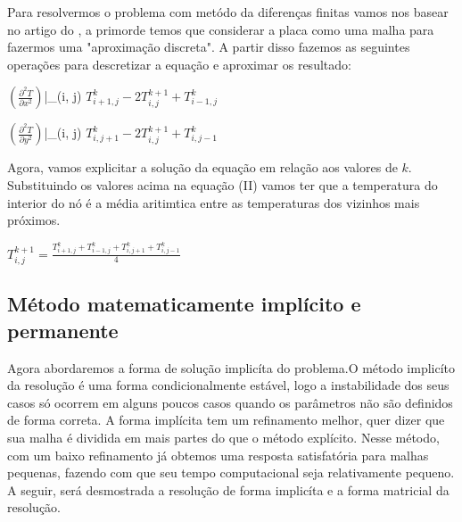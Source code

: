 \documentclass[12pt,a4paper]{article}
\begin{document}
\newline

Para resolvermos o problema com metódo da diferenças finitas vamos nos basear no artigo do \cite{R.R.Pereira}, a primorde temos que considerar a placa como uma malha para fazermos uma "aproximação discreta". A partir disso fazemos as seguintes operações para descretizar a equação e aproximar os resultado:

\newline
\newline

$(\frac{\partial^2 T}{\partial x^2})$\Big|_{(i, j)} \approx  $ T^{k}_{i+1, j} - 2T^{k+1}_{i, j} + T^{k}_{i-1, j}$

\newline


$(\frac{\partial^2 T}{\partial y^2})$\Big|_{(i, j)} \approx  $ T^{k}_{i, j+1} - 2T^{k+1}_{i, j} + T^{k}_{i, j-1}$

Agora, vamos explicitar a solução da equação em relação aos valores de $k$. Substituindo os valores acima na equação (II) vamos ter que a temperatura do interior do nó é a média aritimtica entre as temperaturas dos vizinhos mais próximos. 

\newline

$T^{k+1}_{i, j} = \frac{T^{k}_{i+1, j} + T^{k}_{i-1, j} + T^{k}_{i, j+1} + T^{k}_{i, j-1}}{4}$

\subsection{Método matematicamente implícito e permanente}

Agora abordaremos a forma de solução implicíta do problema.O método implicíto da resolução é uma forma condicionalmente estável, logo a instabilidade dos seus casos só ocorrem em alguns poucos casos quando os parâmetros não são definidos de forma correta. A forma implícita tem um refinamento melhor, quer dizer que sua malha é dividida em mais partes do que o método explícito. Nesse método, com um baixo refinamento já obtemos uma resposta satisfatória para malhas pequenas, fazendo com que seu tempo computacional seja relativamente pequeno. A seguir, será desmostrada a resolução de forma implicíta e a forma matricial da resolução.
\end{document}

